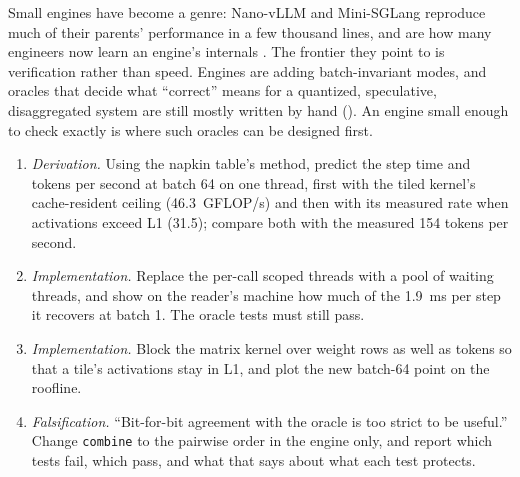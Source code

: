 
Small engines have become a genre: Nano-vLLM and Mini-SGLang reproduce much of
their parents' performance in a few thousand lines, and are how many engineers
now learn an engine's internals \cite{nanovllm2025,lmsys2025minisgl}. The
frontier they point to is verification rather than speed. Engines are adding
batch-invariant modes, and oracles that decide what ``correct'' means for a
quantized, speculative, disaggregated system are still mostly written by hand
(). An engine small enough to check exactly is where
such oracles can be designed first.

\ExercisesSection

\begin{enumerate}
\item \emph{Derivation.} Using the napkin table's method, predict the step time
  and tokens per second at batch 64 on one thread, first with the tiled
  kernel's cache-resident ceiling (46.3~GFLOP/s) and then with its measured rate
  when activations exceed L1 (31.5); compare both with the measured 154 tokens per
  second.
\item \emph{Implementation.} Replace the per-call scoped threads with a pool of
  waiting threads, and show on the reader's machine how much of the 1.9~ms per
  step it recovers at batch 1. The oracle tests must still pass.
\item \emph{Implementation.} Block the matrix kernel over weight rows as well as
  tokens so that a tile's activations stay in L1, and plot the new batch-64 point
  on the roofline.
\item \emph{Falsification.} ``Bit-for-bit agreement with the oracle is too strict
  to be useful.'' Change \texttt{combine} to the pairwise order in the engine
  only, and report which tests fail, which pass, and what that says about what
  each test protects.
\end{enumerate}
